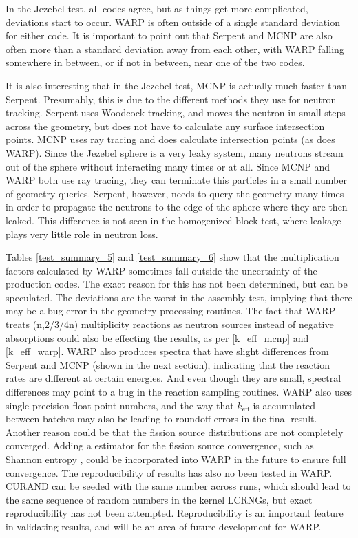 In the Jezebel test, all codes agree, but as things get more complicated, deviations start to occur.  WARP is often outside of a single standard deviation for either code.  It is important to point out that Serpent and MCNP are also often more than a standard deviation away from each other, with WARP falling somewhere in between, or if not in between, near one of the two codes.

It is also interesting that in the Jezebel test, MCNP is actually much faster than Serpent.  Presumably, this is due to the different methods they use for neutron tracking.  Serpent uses Woodcock tracking, and moves the neutron in small steps across the geometry, but does not have to calculate any surface intersection points.  MCNP uses ray tracing and does calculate intersection points (as does WARP).  Since the Jezebel sphere is a very leaky system, many neutrons stream out of the sphere without interacting many times or at all.  Since  MCNP and WARP both use ray tracing, they can terminate this particles in a small number of geometry queries.  Serpent, however, needs to query the geometry many times in order to propagate the neutrons to the edge of the sphere where they are then leaked.  This difference is not seen in the homogenized block test, where leakage plays very little role in neutron loss.

Tables \ref{test_summary_5} and \ref{test_summary_6} show that the multiplication factors calculated by WARP sometimes fall outside the uncertainty of the production codes.  The exact reason for this has not been determined, but can be speculated.  The deviations are the worst in the assembly test, implying that there may be a bug error in the geometry processing routines.  The fact that WARP treats (n,2/3/4n) multiplicity reactions as neutron sources instead of negative absorptions could also be effecting the results, as per \eqref{k_eff_mcnp} and \eqref{k_eff_warp}.  WARP also produces spectra that have slight differences from Serpent and MCNP (shown in the next section), indicating that the reaction rates are different at certain energies.  And even though they are small, spectral differences may point to a bug in the reaction sampling routines.  WARP also uses single precision float point numbers, and the way that $k_\mathrm{eff}$ is accumulated between batches may also be leading to roundoff errors in the final result.  Another reason could be that the fission source distributions are not completely converged.  Adding a estimator for the fission source convergence, such as Shannon entropy \cite{mcnp}, could be incorporated into WARP in the future to ensure full convergence.  The reproducibility of results has also no been tested in WARP.  CURAND can be seeded with the same number across runs, which should lead to the same sequence of random numbers in the kernel LCRNGs, but exact reproducibility has not been attempted.  Reproducibility is an important feature in validating results, and will be an area of future development for WARP.

